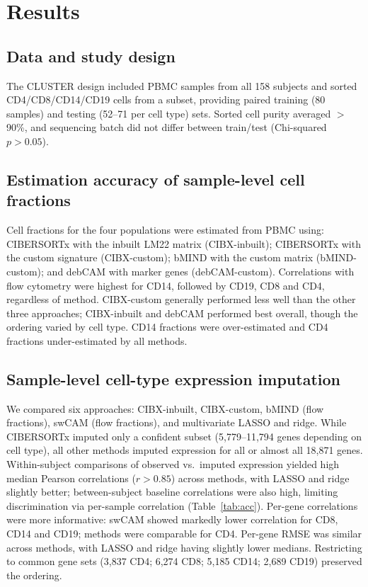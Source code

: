 \documentclass[11pt]{article}
\begin{document}
\section{Results}
\subsection{Data and study design}
The CLUSTER design included PBMC samples from all 158 subjects and sorted CD4/CD8/CD14/CD19 cells from a subset, providing paired training (80 samples) and testing (52--71 per cell type) sets. Sorted cell purity averaged $>$90\%, and sequencing batch did not differ between train/test (Chi-squared $p > 0.05$).

\subsection{Estimation accuracy of sample-level cell fractions}
Cell fractions for the four populations were estimated from PBMC using: CIBERSORTx with the inbuilt LM22 matrix (CIBX-inbuilt); CIBERSORTx with the custom signature (CIBX-custom); bMIND with the custom matrix (bMIND-custom); and debCAM with marker genes (debCAM-custom). Correlations with flow cytometry were highest for CD14, followed by CD19, CD8 and CD4, regardless of method. CIBX-custom generally performed less well than the other three approaches; CIBX-inbuilt and debCAM performed best overall, though the ordering varied by cell type. CD14 fractions were over-estimated and CD4 fractions under-estimated by all methods.

\subsection{Sample-level cell-type expression imputation}
We compared six approaches: CIBX-inbuilt, CIBX-custom, bMIND (flow fractions), swCAM (flow fractions), and multivariate LASSO and ridge. While CIBERSORTx imputed only a confident subset (5,779--11,794 genes depending on cell type), all other methods imputed expression for all or almost all 18,871 genes. Within-subject comparisons of observed vs.\ imputed expression yielded high median Pearson correlations ($r>0.85$) across methods, with LASSO and ridge slightly better; between-subject baseline correlations were also high, limiting discrimination via per-sample correlation (Table~\ref{tab:acc}). Per-gene correlations were more informative: swCAM showed markedly lower correlation for CD8, CD14 and CD19; methods were comparable for CD4. Per-gene RMSE was similar across methods, with LASSO and ridge having slightly lower medians. Restricting to common gene sets (3,837 CD4; 6,274 CD8; 5,185 CD14; 2,689 CD19) preserved the ordering.
\end{document}
